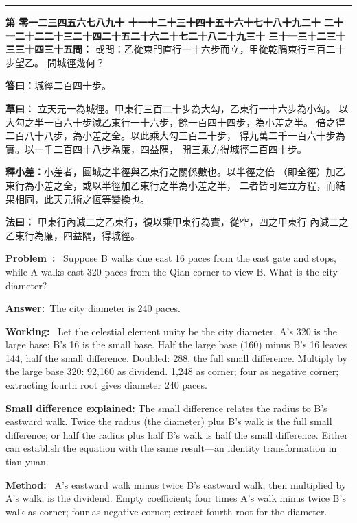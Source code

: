 \documentclass[9pt,a4paper]{article}
\newcounter{probnum}
\newcounter{overallnum}
\newcommand{\chnum}[1]{%
  \ifcase#1 零\or 一\or 二\or 三\or 四\or 五\or 六\or 七\or 八\or 九\or 十\or
    十一\or 十二\or 十三\or 十四\or 十五\or 十六\or 十七\or 十八\or 十九\or 二十\or
    二十一\or 二十二\or 二十三\or 二十四\or 二十五\or 二十六\or 二十七\or 二十八\or 二十九\or 三十\or
    三十一\or 三十二\or 三十三\or 三十四\or 三十五\fi}
\newcommand{\problem}[1]{\stepcounter{probnum}\stepcounter{overallnum}\par\noindent\textbf{\color{volcolor}第\chnum{\value{probnum}}問：}#1\par\vspace{0.15cm}}
\newcommand{\answer}[1]{\par\noindent\textbf{答曰：}#1\par\vspace{0.15cm}}
\newcommand{\working}[1]{\par\noindent\textbf{草曰：}#1\par\vspace{0.15cm}}
\newcommand{\method}[1]{\par\noindent\textbf{法曰：}#1\par\vspace{0.25cm}}
\newcommand{\eproblem}[1]{\par\noindent\textbf{\color{volcolor}Problem~\theoverallnum:}~#1\par\vspace{0.15cm}}
\newcommand{\eanswer}[1]{\par\noindent\textbf{Answer:}~#1\par\vspace{0.15cm}}
\newcommand{\eworking}[1]{\par\noindent\textbf{Working:}~#1\par\vspace{0.15cm}}
\newcommand{\emethod}[1]{\par\noindent\textbf{Method:}~#1\par\vspace{0.25cm}}
\begin{document}
\vspace{0.15cm}
\noindent\rule{\textwidth}{0.2pt}
\vspace{0.15cm}

\noindent\begin{minipage}[t]{0.48\textwidth}
\problem{
或問：乙從東門直行一十六步而立，甲從乾隅東行三百二十步望乙。
問城徑幾何？
}

\answer{城徑二百四十步。}

\working{
立天元一為城徑。甲東行三百二十步為大勾，乙東行一十六步為小勾。
以大勾之半一百六十步減乙東行一十六步，餘一百四十四步，為小差之半。
倍之得二百八十八步，為小差之全。以此乘大勾三百二十步，
得九萬二千一百六十步為實。以一千二百四十八步為廉，四益隅，
開三乘方得城徑二百四十步。

\textbf{釋小差：}小差者，圓城之半徑與乙東行之關係數也。以半徑之倍
（即全徑）加乙東行為小差之全，或以半徑加乙東行之半為小差之半，
二者皆可建立方程，而結果相同，此天元術之恆等變換也。
}

\method{
甲東行內減二之乙東行，復以乘甲東行為實，從空，四之甲東行
內減二之乙東行為廉，四益隅，得城徑。
}
\end{minipage}%
\hfill%
\begin{minipage}[t]{0.50\textwidth}
\eproblem{
Suppose B walks due east 16 paces from the east gate and stops, while A walks
east 320 paces from the Qian corner to view B. What is the city diameter?
}

\eanswer{The city diameter is 240 paces.}

\eworking{
Let the celestial element unity be the city diameter. A's 320 is the large
base; B's 16 is the small base. Half the large base (160) minus B's 16 leaves
144, half the small difference. Doubled: 288, the full small difference.
Multiply by the large base 320: 92,160 as dividend. 1,248 as corner;
four as negative corner; extracting fourth root gives diameter 240 paces.

\textbf{Small difference explained:} The small difference relates the radius
to B's eastward walk. Twice the radius (the diameter) plus B's walk is the
full small difference; or half the radius plus half B's walk is half the small
difference. Either can establish the equation with the same result---an
identity transformation in tian yuan.
}

\emethod{
A's eastward walk minus twice B's eastward walk, then multiplied by A's walk,
is the dividend. Empty coefficient; four times A's walk minus twice B's walk
as corner; four as negative corner; extract fourth root for the diameter.
}
\end{minipage}
\vspace{0.15cm}
\end{document}
